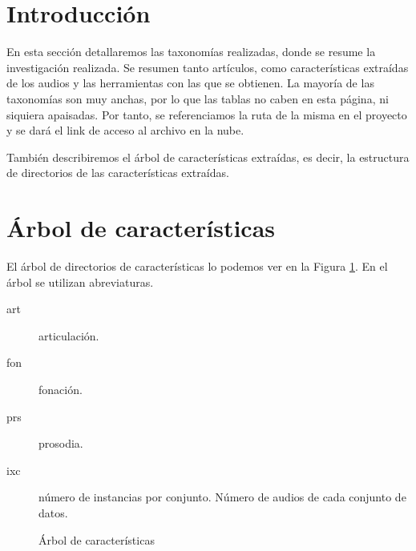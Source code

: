 
\section{Introducción}
En esta sección detallaremos las taxonomías realizadas, donde se resume la investigación realizada. Se resumen tanto artículos, como características extraídas de los audios y las herramientas con las que se obtienen. La mayoría de las taxonomías son muy anchas, por lo que  las tablas no caben en esta página, ni siquiera apaisadas. Por tanto, se referenciamos la ruta de la misma en el proyecto y se dará el link de acceso al archivo en la nube. 

También describiremos el árbol de características extraídas, es decir, la estructura de directorios de las características extraídas.

\section{Árbol de características}
El árbol de directorios de características lo podemos ver en la Figura \ref{fig:dirtreeccas}. En el árbol se utilizan abreviaturas.
\begin{description}
\item[art] articulación.
\item[fon] fonación.
\item[prs] prosodia.
\item[ixc] número de instancias por conjunto. Número de audios de cada conjunto de datos.
\end{description}

\begin{figure}
	\caption{Árbol de características}
	\label{fig:dirtreeccas}
\end{figure}

